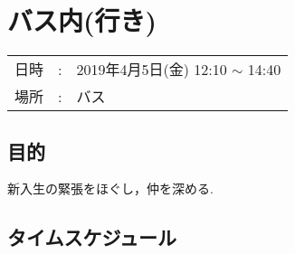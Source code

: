 

\section{バス内(行き)}

\begin{tabular}{p{}rp{}}
  日時 & : & 2019年4月5日(金) 12:10 $\sim$ 14:40\\ %
  場所 & : & バス
\end{tabular}

\subsection{目的}
新入生の緊張をほぐし，仲を深める.


\subsection{タイムスケジュール}
